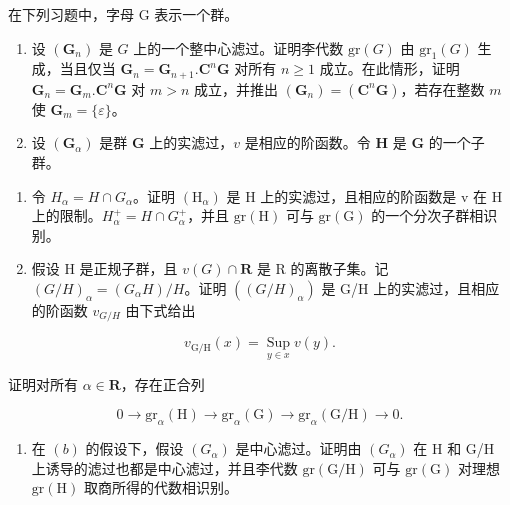 
在下列习题中，字母 G 表示一个群。

\begin{enumerate}
\def\labelenumi{\arabic{enumi}.}
\item
  设 \((\mathbf{G}_n)\) 是 \(G\) 上的一个整中心滤过。证明李代数 \(\mathrm{gr}(G)\) 由 \(\mathrm{gr}_1(G)\) 生成，当且仅当 \(\mathbf{G}_n = \mathbf{G}_{n+1}.\mathbf{C}^n\mathbf{G}\) 对所有 \(n \geqslant 1\) 成立。在此情形，证明 \(\mathbf{G}_n = \mathbf{G}_m.\mathbf{C}^n\mathbf{G}\) 对 \(m > n\) 成立，并推出 \((\mathbf{G}_n) = (\mathbf{C}^n\mathbf{G})\)，若存在整数 \(m\) 使 \(\mathbf{G}_m = \{\varepsilon\}\)。
\item
  设 \((\mathbf{G}_{\alpha})\) 是群 \(\mathbf{G}\) 上的实滤过，\(v\) 是相应的阶函数。令 \(\mathbf{H}\) 是 \(\mathbf{G}\) 的一个子群。
\end{enumerate}

\begin{enumerate}
\def\labelenumi{(\alph{enumi})}
\item
  令 \(H_{\alpha} = H \cap G_{\alpha}\)。证明 \((\mathrm{H}_{\alpha})\) 是 H 上的实滤过，且相应的阶函数是 v 在 H 上的限制。\(H_{\alpha}^{+} = H \cap G_{\alpha}^{+}\)，并且 \(\mathrm{gr}(\mathrm{H})\) 可与 \(\mathrm{gr}(\mathrm{G})\) 的一个分次子群相识别。
\item
  假设 H 是正规子群，且 \(v(G) \cap \mathbf{R}\) 是 R 的离散子集。记 \((G/H)_{\alpha} = (G_{\alpha}H)/H\)。证明 \(((G/H)_{\alpha})\) 是 G/H 上的实滤过，且相应的阶函数 \(v_{G/H}\) 由下式给出
\end{enumerate}

\[
v _ {\mathrm{G/H}} (x) = \operatorname * {S u p} _ {y \in x} v (y).
\]

证明对所有 \(\alpha \in \mathbf{R}\)，存在正合列

\[
0 \rightarrow \mathrm{gr} _ {\alpha} (\mathrm{H}) \rightarrow \mathrm{gr} _ {\alpha} (\mathrm{G}) \rightarrow \mathrm{gr} _ {\alpha} (\mathrm{G} / \mathrm{H}) \rightarrow 0.
\]

\begin{enumerate}
\def\labelenumi{(\alph{enumi})}
\setcounter{enumi}{2}
\tightlist
\item
  在 \((b)\) 的假设下，假设 \((G_{\alpha})\) 是中心滤过。证明由 \((G_{\alpha})\) 在 H 和 G/H 上诱导的滤过也都是中心滤过，并且李代数 \(\mathrm{gr}(\mathrm{G}/\mathrm{H})\) 可与 \(\mathrm{gr}(\mathrm{G})\) 对理想 \(\mathrm{gr}(\mathrm{H})\) 取商所得的代数相识别。
\end{enumerate}

